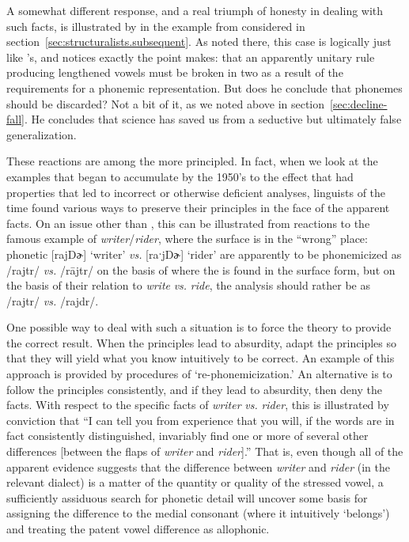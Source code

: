 A somewhat different response, and a real triumph of honesty in
dealing with such facts, is illustrated by \citet{bloch41:overlapping}
in the example from  considered in
section~\ref{sec:structuralists.subsequent}.  As noted there, this case is
logically just like {\Halle}'s, and {\Bloch} notices exactly the point {\Halle}
makes: that an apparently unitary rule producing lengthened vowels
must be broken in two as a result of the requirements for a phonemic
representation. But does he conclude that phonemes should be
discarded? Not a bit of it, as we noted above in
section~\ref{sec:decline-fall}. He concludes that science has saved us
from a seductive but ultimately false generalization.

These reactions are among the more principled. In fact, when we look
at the examples that began to accumulate by the 1950's to the effect
that  had properties that led to incorrect or
otherwise deficient analyses, linguists of the time found various ways
to preserve their principles in the face of the apparent facts. On an
issue other than , this can be illustrated from reactions
to the famous example of \emph{writer}/\emph{rider}, where the surface
 is in the ``wrong'' place: phonetic {[rajDɚ]} `writer'
\emph{vs.} {[raˑjDɚ]} `rider' are apparently to be phonemicized as
/rajtr/ \emph{vs.} /rājtr/ on the basis of where the  is found
in the surface form, but on the basis of their relation to
\emph{write} \emph{vs.} \emph{ride}, the analysis should rather be as
/rajtr/ \emph{vs.} /rajdr/.

One possible way to deal with such a situation is to force the theory
to provide the correct result. When the principles lead to absurdity,
adapt the principles so that they will yield what you know intuitively
to be correct. An example of this approach is provided by
 procedures of `re-phonemiciz\-ation.'  An
alternative is to follow the principles consistently, and if they lead
to absurdity, then deny the facts. With respect to the specific facts
of \emph{writer} \emph{vs.} \emph{rider}, this is illustrated by
 conviction that ``I can tell
you from experience that you will, if the words are in fact
consistently distinguished, invariably find one or more of several
other differences {[between the flaps of \emph{writer} and
  \emph{rider}]}.'' That is, even though all of the apparent evidence
suggests that the difference between \emph{writer} and \emph{rider}
(in the relevant dialect) is a matter of the quantity or quality of
the stressed vowel, a sufficiently assiduous search for phonetic
detail will uncover some basis for assigning the difference to the
medial consonant (where it intuitively `belongs') and treating the
patent vowel difference as allophonic.

